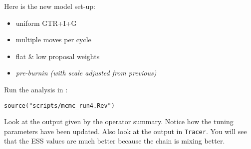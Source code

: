 Here is the new model set-up:
\begin{itemize}
\item{uniform GTR+I+G}
\item{multiple moves per cycle}
\item{flat \& low proposal weights}
\item{\it pre-burnin (with scale adjusted from previous)}
\end{itemize}
Run the analysis in \RevBayes:
{\tt \begin{snugshade*}
\begin{lstlisting}
source("scripts/mcmc_run4.Rev")
\end{lstlisting}
\end{snugshade*}}
Look at the output given by the operator summary.
Notice how the tuning parameters have been updated.
Also look at the output in \verb!Tracer!.
You will see that the ESS values are much better because the chain is mixing better.


